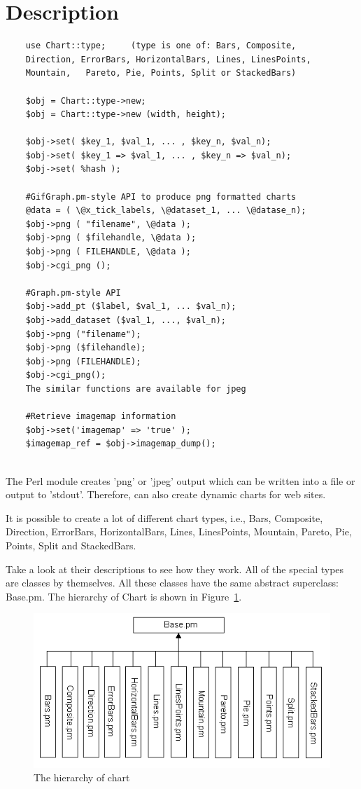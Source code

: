 \clearpage
\section{Description}
\begin{verbatim}
	use Chart::type;     (type is one of: Bars, Composite,
	Direction, ErrorBars, HorizontalBars, Lines, LinesPoints,
	Mountain,	Pareto, Pie, Points, Split or StackedBars)
		
	$obj = Chart::type->new;
	$obj = Chart::type->new (width, height);
	
	$obj->set( $key_1, $val_1, ... , $key_n, $val_n);
	$obj->set( $key_1 => $val_1, ... , $key_n => $val_n);
	$obj->set( %hash );
	
	#GifGraph.pm-style API to produce png formatted charts
	@data = ( \@x_tick_labels, \@dataset_1, ... \@datase_n);
	$obj->png ( "filename", \@data );
	$obj->png ( $filehandle, \@data );
	$obj->png ( FILEHANDLE, \@data );
	$obj->cgi_png ();
	
	#Graph.pm-style API
	$obj->add_pt ($label, $val_1, ... $val_n);
	$obj->add_dataset ($val_1, ..., $val_n);
	$obj->png ("filename");
	$obj->png ($filehandle);
	$obj->png (FILEHANDLE);
	$obj->cgi_png();
	The similar functions are available for jpeg	
	
	#Retrieve imagemap information
	$obj->set('imagemap' => 'true' );
	$imagemap_ref = $obj->imagemap_dump();
	
\end{verbatim}
\clearpage
The Perl module  creates 'png' or 'jpeg' output which can be 
written into a file or output to 'stdout'. 
Therefore,  can also create dynamic charts for web sites.

It is possible to create a lot of different chart types, i.e., 
Bars, Composite, Direction, ErrorBars, HorizontalBars, Lines, LinesPoints, 
Mountain, Pareto, Pie, Points, Split and StackedBars.

Take a look at their descriptions to see how they work. 
All of the special types are classes by themselves. 
All these classes have the same abstract superclass: Base.pm. 
The hierarchy of Chart is shown in Figure~\ref{fig:Aufbau}.      

\begin{figure}[h]
	\begin{center}
		\includegraphics[scale=0.5]{Aufbau.png}
	\end{center}
	\caption{The hierarchy of chart}
	\label{fig:Aufbau}
\end{figure}

